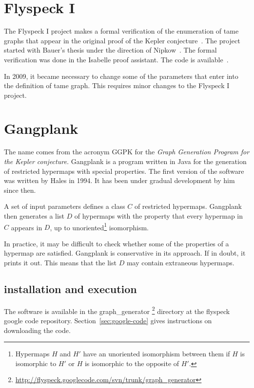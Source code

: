 \section{Flyspeck I}

The Flyspeck I project makes a formal verification of the enumeration
of tame graphs that appear in the original proof of the Kepler
conjecture~\cite{BauerN-AFP06}.  The project started with Bauer's
thesis under the direction of Nipkow~\cite{Bauer:2006:Thesis}.  The
formal verification was done in the Isabelle proof assistant.  The
code is available~\cite{BauerN-Flyspeck-I-Isabelle}.

In 2009, it became necessary to change some of the parameters that enter into the definition of tame graph.  This requires minor changes to the Flyspeck I project.



\section{Gangplank}

The name  comes from the acronym GGPK for the {\it
  Graph Generation Program for the Kepler conjecture.}  Gangplank is a
program written in Java for the generation of restricted hypermaps with special properties.
The first version of the software was written by Hales in 1994.  It
has been under gradual development by him since then.

A set of input parameters defines a class $C$ of restricted hypermaps.  Gangplank
then generates a list $D$ of hypermaps with the property that every hypermap in $C$
appears in $D$, up to unoriented\footnote{Hypermaps $H$ and $H'$ have
an unoriented isomorphism between them if $H$ is isomorphic to $H'$ or
$H$ is isomorphic to the opposite of $H'$.} isomorphism.

In practice, it may be difficult to check whether some of the properties of  a hypermap
are satisfied.  Gangplank is conservative in its approach.  If in doubt, it prints it out.
This means that the list $D$ may contain extraneous hypermaps.

\subsection{installation and execution}

The software is available in the graph\_generator%
\footnote {\url{http://flyspeck.googlecode.com/svn/trunk/graph_generator}} %
 directory at the flyspeck google code repository.  Section~\ref{sec:google-code} gives instructions on downloading the code.

